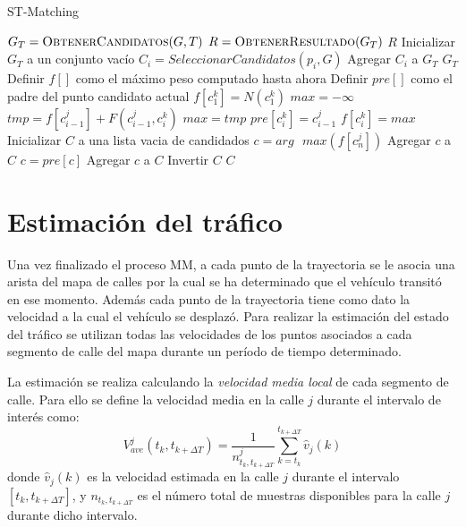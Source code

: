 \begin{algorithm}
\caption{ST-Matching}
\label{alg:st_matching}
\begin{algorithmic}[1]
	\State $G_T = \Call{ObtenerCandidatos}{G,T}$
	\State $R = \Call{ObtenerResultado}{G_T}$
	\State \Return $R$
\EndProcedure
\Statex
{}
	\State Inicializar $G_T$ a un conjunto vacío
		\State $C_i = SeleccionarCandidatos(p_i, G)$
		\State Agregar $C_i$ a $G_T$
	\EndFor
	\State \Return $G_T$
\EndFunction
\Statex
{}
	\State Definir $f[]$ como el máximo peso computado hasta ahora
	\State Definir $pre[]$ como el padre del punto candidato actual
		\State $f[c_1^k] = N(c_1^k)$
	\EndFor
			\State $max = -\infty$
				\State $tmp = f[c_{i-1}^j] + F(c_{i-1}^j,c_i^k)$
					\State $max = tmp$
					\State $pre[c_i^k] = c_{i-1}^j$
				\EndIf
				\State $f[c_i^k] = max$
			\EndFor
		\EndFor
	\EndFor
	\State Inicializar $C$ a una lista vacia de candidados
	\State $c = arg \text{ } max(f[c_n^j])$
		\State Agregar $c$ a $C$
		\State $c = pre[c]$
	\EndFor
	\State Agregar $c$ a $C$
	\State Invertir $C$
	\State \Return $C$
\EndFunction
\end{algorithmic}
\end{algorithm}

\section{Estimación del tráfico}
\label{estimacion_trafico}

Una vez finalizado el proceso MM, a cada punto de la trayectoria se le asocia una arista del mapa de calles por la cual se ha determinado que el vehículo transitó en ese momento. Además cada punto de la trayectoria tiene como dato la velocidad a la cual el vehículo se desplazó. Para realizar la estimación del estado del tráfico se utilizan todas las velocidades de los puntos asociados a cada segmento de calle del mapa durante un período de tiempo determinado.

La estimación se realiza calculando la \emph{velocidad media local} de cada segmento de calle. Para ello se define la velocidad media en la calle $j$ durante el intervalo de interés como:
\begin{equation}
\label{eq:velocidad_media}
{ V }_{ ave }^{ j }({ t }_{ k },{ t }_{ k+\Delta T })=\frac { 1 }{ { n }_{ { t }_{ k },{ t }_{ k+\Delta T } }^{ j } } \sum_{ k={ t }_{ k } }^{ { t }_{ k+\Delta T } }{ \hat { { v } } _{ j }(k) }
\end{equation}
donde ${ \hat { { v } } _{ j }(k) }$ es la velocidad estimada en la calle $j$ durante el intervalo $\left[ { t }_{ k },{ t }_{ k+\Delta T } \right] $, y ${ { n }_{ { t }_{ k },{ t }_{ k+\Delta T }}}$ es el número total de muestras disponibles para la calle $j$ durante dicho intervalo.


